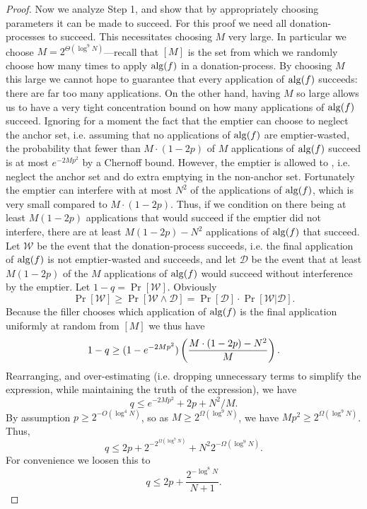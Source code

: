\begin{proof}
  Now we analyze Step 1, and show that by appropriately choosing
  parameters it can be made to succeed. For this proof we need
  all donation-processes to succeed. This necessitates choosing
  $M$ very large. In particular we choose $M = 2^{\Theta(\log^9
  N)}$---recall that $[M]$ is the set from which we randomly choose
  how many times to apply $\operatorname{\text{\textup{alg}}}(f)$ in a donation-process. By
  choosing $M$ this large we cannot hope to guarantee that every
  application of $\operatorname{\text{\textup{alg}}}(f)$ succeeds: there are far too many
  applications. On the other hand, having $M$ so large allows us
  to have a very tight concentration bound on how many
  applications of $\operatorname{\text{\textup{alg}}}(f)$ succeed. Ignoring for a moment the
  fact that the emptier can choose to neglect the anchor set,
  i.e. assuming that no applications of $\operatorname{\text{\textup{alg}}}(f)$ are
  emptier-wasted, the probability that fewer than $M\cdot (1-2p)$
  of $M$ applications of $\operatorname{\text{\textup{alg}}}(f)$ succeed is at most
  $e^{-2Mp^2}$ by a Chernoff bound. However, the emptier is
  allowed to , i.e. neglect the anchor set and do
  extra emptying in the non-anchor set. Fortunately the emptier
  can interfere with at most $N^2$ of the applications of
  $\operatorname{\text{\textup{alg}}}(f)$, which is very small compared to $M\cdot (1-2p)$.
  Thus, if we condition on there being at least $M(1-2p)$
  applications that would succeed if the emptier did not
  interfere, there are at least $M(1-2p)-N^2$ applications of
  $\operatorname{\text{\textup{alg}}}(f)$ that succeed. Let $\mathcal{W}$ be the event that the
  donation-process succeeds, i.e. the final application of
  $\operatorname{\text{\textup{alg}}}(f)$ is not emptier-wasted and succeeds, and let
  $\mathcal{D}$ be the event that at least $M(1-2p)$ of the $M$
  applications of $\operatorname{\text{\textup{alg}}}(f)$ would succeed without  interference
  by the emptier. Let $1-q = \Pr[\mathcal{W}]$. Obviously
  $$\Pr[\mathcal{W}] \ge \Pr[\mathcal{W} \land \mathcal{D}] =
  \Pr[\mathcal{D}] \cdot \Pr[\mathcal{W} | \mathcal{D}].$$
  Because the filler chooses which application of $\operatorname{\text{\textup{alg}}}(f)$ is
  the final application uniformly at random from $[M]$ we thus
  have $$1-q \ge (1-e^{-2Mp^2})\left( \frac{M\cdot
  (1-2p)-N^2}{M} \right).$$ Rearranging, and over-estimating (i.e.
  dropping unnecessary terms to simplify the expression, while
  maintaining the truth of the expression), we have $$q \le
  e^{-2Mp^2} + 2p + N^2/M.$$ By assumption $p \ge
  2^{-O(\log^4 N)}$, so as $M \ge 2^{\Omega(\log^9 N)}$, we have
  $Mp^2 \ge 2^{\Omega(\log^9 N)}$. Thus,
  $$q \le 2p + 2^{-2^{\Omega(\log^9 N)}} +
  N^2 2^{-\Omega(\log^{9} N)}.$$ 
  For convenience we loosen this to $$q \le 2p + \frac{2^{-\log^8 N}}{N+1}.$$


\end{proof}
